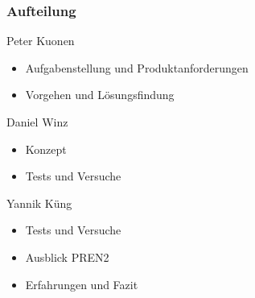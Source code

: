 \begin{frame}
    \frametitle{Aufteilung}
    \begin{block}{Peter Kuonen}
        \begin{itemize}
            \item Aufgabenstellung und Produktanforderungen
            \item Vorgehen und Lösungsfindung
        \end{itemize}
    \end{block}
    \begin{block}{Daniel Winz}
        \begin{itemize}
            \item Konzept
            \item Tests und Versuche
        \end{itemize}
    \end{block}
    \begin{block}{Yannik Küng}
        \begin{itemize}
            \item Tests und Versuche
            \item Ausblick PREN2
            \item Erfahrungen und Fazit
        \end{itemize}
    \end{block}
\end{frame}

